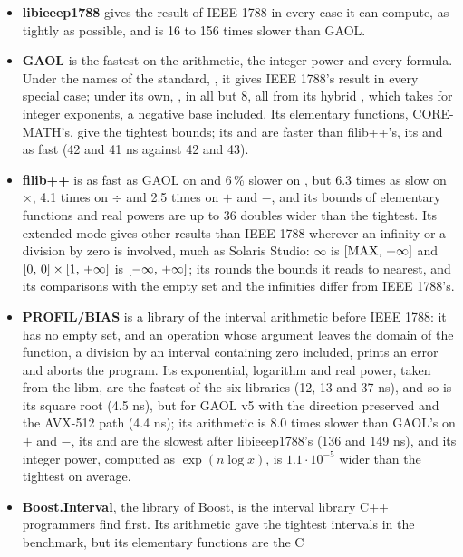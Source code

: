 \begin{itemize}
\item[$\bullet$] \textbf{libieeep1788} gives the result of IEEE 1788 in
every case it can compute, as tightly as possible, and is 16 to 156 times slower than GAOL.
\item[$\bullet$] \textbf{GAOL} is the fastest on the arithmetic, the integer power and every formula. Under the names of the standard,
, it gives IEEE 1788's result in every special case;
under its own, , in all but 8, all from its hybrid ,
which takes  for integer exponents, a negative base included. Its
elementary functions, CORE-MATH's, give the tightest bounds; its 
and  are faster than filib++'s, its  and  as fast (42 and 41 ns against 42 and 43).
\item[$\bullet$] \textbf{filib++} is as fast as GAOL on  and 6\,\% slower on , but 6.3 times as slow on $\times$, 4.1 times on $\div$ and 2.5 times on $+$ and $-$, and its bounds
of elementary functions and real powers are up to 36 doubles wider than the
tightest. Its extended mode gives other results than IEEE 1788 wherever an
infinity or a division by zero is involved, much as Solaris Studio:
$\infty$\code{)} is $[\mathrm{MAX},\,+\infty]$ and
$[0,\,0] \times [1,\,+\infty]$ is $[-\infty,\,+\infty]$; its
 rounds the bounds it reads to nearest, and its
comparisons with the empty set and the infinities differ from IEEE 1788's.
\item[$\bullet$] \textbf{PROFIL/BIAS} is a library of the interval
arithmetic before IEEE 1788: it has no empty set, and an operation whose
argument leaves the domain of the function, a division by an interval
containing zero included, prints an error and aborts the program. Its
exponential, logarithm and real power, taken from the libm, are the fastest
of the six libraries (12, 13 and 37 ns), and so is its square root (4.5 ns), but for GAOL v5 with the direction preserved and the AVX-512 path (4.4 ns); its arithmetic is 8.0 times slower than GAOL's on $+$ and $-$, its  and  are the slowest after libieeep1788's (136 and 149 ns), and
its integer power, computed as $\exp(n \log x)$, is $1.1\cdot10^{-5}$ wider
than the tightest on average.
\item[$\bullet$] \textbf{Boost.Interval}, the library of Boost, is the
interval library C++ programmers find first. Its arithmetic gave the
tightest intervals in the benchmark, but its elementary functions are the C

\end{itemize}
